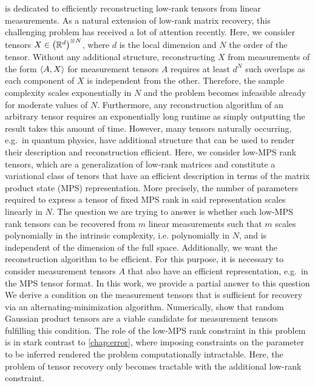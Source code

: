  is dedicated to efficiently reconstructing low-rank tensors from linear measurements.
As a natural extension of low-rank matrix recovery, this challenging problem has received a lot of attention recently.
Here, we consider tensors $X \in {\left({\mathbb{R}}^d\right)}^{\otimes N}$, where $d$ is the local dimension and $N$ the order of the tensor.
Without any additional structure, reconstructing $X$ from measurements of the form  $\braket{A, X}$ for measurement tensors $A$ requires at least $d^N$ such overlaps as each component of $X$ is independent from the other.
Therefore, the sample complexity scales exponentially in $N$ and the problem becomes infeasible already for moderate values of $N$.
Furthermore, any reconstruction algorithm of an arbitrary tensor requires an exponentially long runtime as simply outputting the result takes this amount of time.
However, many tensors naturally occurring, e.g.\ in quantum physics,  have additional structure that can be used to render their description and reconstruction efficient.
Here, we consider low-MPS rank tensors, which are a generalization of low-rank matrices and constitute a variational class of tenors that have an efficient description in terms of the matrix product state (MPS) representation.
More precisely, the number of parameters required to express a tensor of fixed MPS rank in said representation scales linearly in $N$.
The question we are trying to answer is whether such low-MPS rank tensors can be recovered from $m$ linear measurements such that $m$ scales polynomially in the intrinsic complexity, i.e.
 polynomially in $N$, and is independent of the dimension of the full space.
Additionally, we want the reconstruction algorithm to be efficient.
For this purpose, it is necessary to consider measurement tensors $A$ that also have an efficient representation, e.g.\ in the MPS tensor format.
In this work, we provide a partial answer to this question
We derive a condition on the measurement tensors that is sufficient for recovery via an alternating-minimization algorithm.
Numerically, show that random Gaussian product tensors are a viable candidate for measurement tensors fulfilling this condition.
The role of the low-MPS rank constraint in this problem is in stark contrast to \cref{chap:error}, where imposing constraints on the parameter to be inferred rendered the problem computationally intractable.
Here, the problem of tensor recovery only becomes tractable with the additional low-rank constraint.

